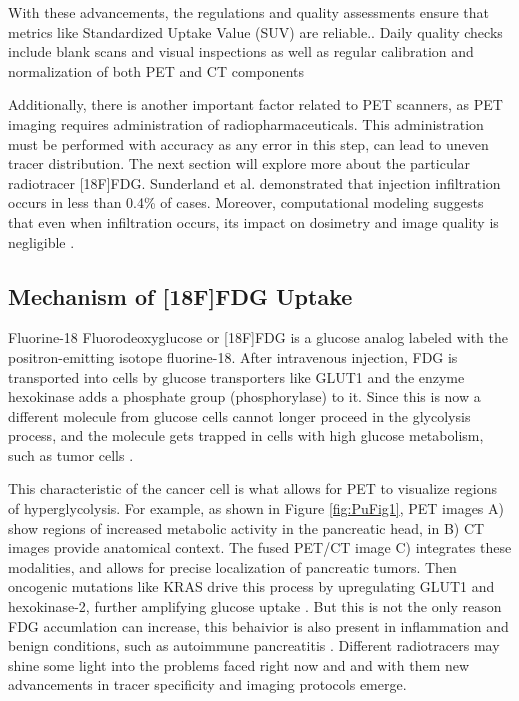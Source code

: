 \begin{multicols}{2}
With these advancements, the regulations and quality assessments ensure that metrics like Standardized Uptake Value (SUV) are reliable.\cite{TG174}. Daily quality checks include blank scans and visual inspections as well as regular calibration and normalization of both PET and CT components

Additionally, there is another important factor related to PET scanners, as PET imaging requires administration of radiopharmaceuticals. This administration must be performed with accuracy as any error in this step, can lead to uneven tracer distribution. The next section will explore more about the particular radiotracer [18F]FDG. Sunderland et al. demonstrated that injection infiltration occurs in less than 0.4\% of cases. Moreover, computational modeling suggests that even when infiltration occurs, its impact on dosimetry and image quality is negligible  \cite{Sunderland2023}. 


\end{multicols}

\subsection{Mechanism of [18F]FDG Uptake}


Fluorine-18 Fluorodeoxyglucose or [18F]FDG is a glucose analog labeled with the positron-emitting isotope fluorine-18. After intravenous injection, FDG is transported into cells by glucose transporters like GLUT1 and  the enzyme hexokinase adds a phosphate group (phosphorylase) to it. Since this is now a different molecule from glucose cells cannot longer proceed in the glycolysis process, and the molecule gets trapped in cells with high glucose metabolism, such as tumor cells \cite{TG174, Zheng2018}.

This characteristic of the cancer cell is what allows for PET to visualize regions of hyperglycolysis. For example, as shown in Figure \ref{fig:PuFig1}, PET images A) show regions of increased metabolic activity in the pancreatic head, in B) CT images provide anatomical context. %
The fused PET/CT image C) integrates these modalities, and allows for precise localization of pancreatic tumors.
Then oncogenic mutations like KRAS drive this process by upregulating GLUT1 and hexokinase-2, further amplifying glucose uptake \cite{Deng2021}. But this is not the only reason FDG accumlation can increase, this behaivior is also present in inflammation and benign conditions, such as autoimmune pancreatitis \cite{Zheng2018}. Different radiotracers may shine some light into the problems faced right now and and with them new advancements in tracer specificity and imaging protocols emerge.



